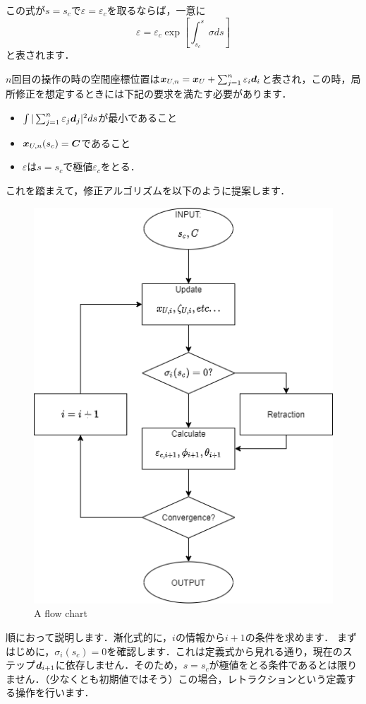 \documentclass[16.7pt]{jsarticle}
\begin{document}
		この式が$ s = s_c $で$ \varepsilon=\varepsilon_c $を取るならば，一意に
		\begin{equation}\label{eq:vareq}
			\varepsilon = \varepsilon_c \exp \left[ \int_{s_c}^{s} \sigma ds \right]
		\end{equation}
		と表されます．
		
		$ n $回目の操作の時の空間座標位置は$ \boldsymbol{x}_{U,n} = \boldsymbol{x}_U + \sum_{j=1}^{n} \varepsilon_i \boldsymbol{d}_i$と表され，この時，局所修正を想定するときには下記の要求を満たす必要があります．
		\begin{itemize}
			\item $ \int |\sum_{j=1}^{n} \varepsilon_j \boldsymbol{d}_j|^2 ds  $が最小であること
			\item $ \boldsymbol{x}_{U,n}(s_c) = \boldsymbol{C} $であること
			\item $ \varepsilon $は$ s=s_c $で極値$ \varepsilon_c $をとる．
		\end{itemize}
		これを踏まえて，修正アルゴリズムを以下のように提案します．
		
		\begin{figure}[H]
			\centering
			\includegraphics[width = 0.6\columnwidth]{figure/AmendFlow.png}
			\caption{A flow chart}
		\end{figure}
		
		順におって説明します．漸化式的に，$i$の情報から$ i+1 $の条件を求めます．
		まずはじめに，$ \sigma_i(s_c)=0 $を確認します．これは定義式から見れる通り，現在のステップ$ \boldsymbol{d}_{i+1} $に依存しません．そのため，$ s=s_c $が極値をとる条件であるとは限りません．（少なくとも初期値ではそう）この場合，レトラクションという定義する操作を行います．
		
\end{document}
